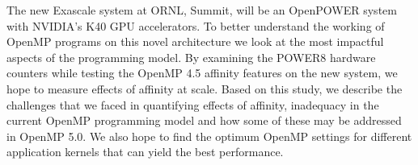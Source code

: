 The new Exascale system at ORNL, Summit, will be an OpenPOWER system with NVIDIA's K40 GPU accelerators. To better understand the working of OpenMP 
programs on this novel architecture we look at the most impactful aspects of the programming model. By examining the POWER8 hardware counters while testing the OpenMP 4.5 affinity features on the new system, we hope to measure effects of affinity at scale. Based on this study, we describe the challenges that we faced in quantifying effects of affinity, inadequacy in the current OpenMP programming model and how some of these may be addressed in OpenMP 5.0. We also hope to find the optimum OpenMP settings for different application kernels that can yield the best performance.